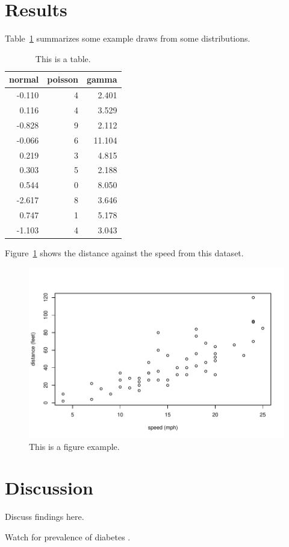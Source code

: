 \documentclass[12pt, titlepage]{article}
\begin{document}
\section{Results}
\label{sec:resu}

Table~\ref{tab:rv} summarizes some example draws from some distributions.
\lipsum[1-4]

\begin{table}[tbp]
  \caption{This is a table.}
  \label{tab:rv}
\centering
\begin{tabular}{rrr}
  \toprule
normal & poisson & gamma \\ 
  \midrule
-0.110 & 4 & 2.401 \\ 
  0.116 & 4 & 3.529 \\ 
  -0.828 & 9 & 2.112 \\ 
  -0.066 & 6 & 11.104 \\ 
  0.219 & 3 & 4.815 \\ 
  0.303 & 5 & 2.188 \\ 
  0.544 & 0 & 8.050 \\ 
  -2.617 & 8 & 3.646 \\ 
  0.747 & 1 & 5.178 \\ 
  -1.103 & 4 & 3.043 \\ 
   \bottomrule
\end{tabular}
\end{table}

Figure~\ref{fig:cars} shows the distance against the speed from this dataset.


\begin{figure}[tbp]
  \centering
  \includegraphics[width=\textwidth]{cars.pdf}
  \caption{This is a figure example.}
  \label{fig:cars}
\end{figure}

\section{Discussion}
\label{sec:disc}

Discuss findings here.

\lipsum[1-2]
Watch for prevalence of diabetes \citep{mehta1991epidemiology}.



\end{document}
